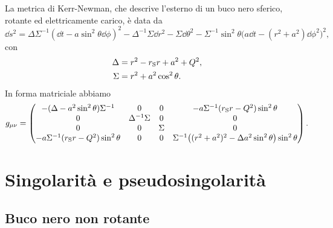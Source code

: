 La metrica di Kerr-Newman, che descrive l'esterno di un buco nero sferico,
rotante ed elettricamente carico, è data da
\begin{equation}
  \label{eq:metrica-kerr-newman}
  \dd s^{2} = \Delta\Sigma^{-1}(\dd t - a\sin^{2}\theta\dd\phi)^{2} -
  \Delta^{-1}\Sigma\dd r^{2} - \Sigma\dd\theta^{2} -
  \Sigma^{-1}\sin^{2}\theta\bigl(a\dd t - (r^{2} + a^{2})\dd\phi^{2}\bigr)^{2},
\end{equation}
con
\begin{subequations}
  \begin{align}
    \Delta &= r^{2} - r_{\textup{S}}r + a^{2} + Q^{2}, \\
    \Sigma &= r^{2} + a^{2}\cos^{2}\theta.
  \end{align}
\end{subequations}
In forma matriciale abbiamo
\begin{equation}
  g_{\mu\nu} =
  \begin{pmatrix}
    -(\Delta - a^{2}\sin^{2}\theta)\Sigma^{-1} & 0 & 0 &
    -a\Sigma^{-1}(r_{\textup{S}}r - Q^{2})\sin^{2}\theta \\
    0 & \Delta^{-1}\Sigma & 0 & 0 \\
    0 & 0 & \Sigma & 0 \\
    -a\Sigma^{-1}(r_{\textup{S}}r - Q^{2})\sin^{2}\theta & 0 & 0 &
    \Sigma^{-1}\bigl((r^{2} + a^{2})^{2} - \Delta
    a^{2}\sin^{2}\theta\bigr)\sin^{2}\theta
  \end{pmatrix}.
\end{equation}

\section{Singolarità e pseudosingolarità}
\label{sec:singolarita}

\subsection{Buco nero non rotante}
\label{sec:singolarita-schwarzschild}

